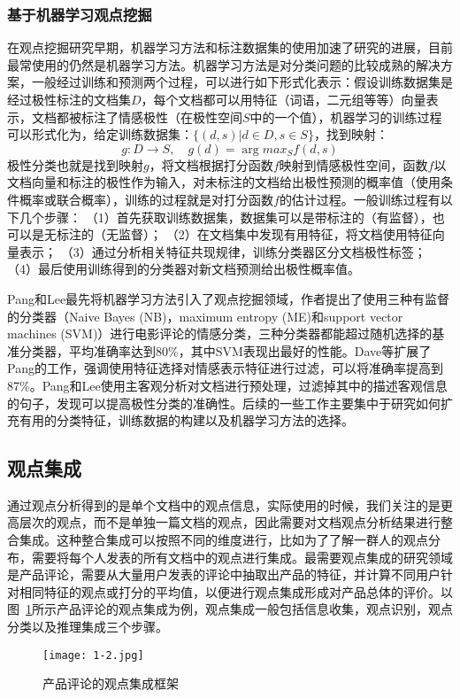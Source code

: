 \subsubsection{基于机器学习观点挖掘}
在观点挖掘研究早期，机器学习方法和标注数据集的使用加速了研究的进展，目前最常使用的仍然是机器学习方法。机器学习方法是对分类问题的比较成熟的解决方案，一般经过训练和预测两个过程，可以进行如下形式化表示：假设训练数据集是经过极性标注的文档集$D$，每个文档都可以用特征（词语，二元组等等）向量表示，文档都被标注了情感极性（在极性空间$S$中的一个值），机器学习的训练过程可以形式化为，给定训练数据集：$ \{(d,s)|d \in D,s \in S\} $，找到映射：
\begin{equation}
g:D \rightarrow S,\quad g(d)=\arg max_S f(d,s)
\end{equation}
极性分类也就是找到映射$ g $，将文档根据打分函数$ f $映射到情感极性空间，函数$ f $以文档向量和标注的极性作为输入，对未标注的文档给出极性预测的概率值（使用条件概率或联合概率），训练的过程就是对打分函数$ f $的估计过程。一般训练过程有以下几个步骤：
（1）首先获取训练数据集，数据集可以是带标注的（有监督），也可以是无标注的（无监督）；
（2）在文档集中发现有用特征，将文档使用特征向量表示；
（3）通过分析相关特征共现规律，训练分类器区分文档极性标签；
（4）最后使用训练得到的分类器对新文档预测给出极性概率值。

Pang和Lee最先将机器学习方法引入了观点挖掘领域，作者提出了使用三种有监督的分类器（Naive Bayes (NB)，maximum entropy (ME)和support vector machines (SVM)）进行电影评论的情感分类，三种分类器都能超过随机选择的基准分类器，平均准确率达到80\%，其中SVM表现出最好的性能。Dave等扩展了Pang的工作，强调使用特征选择对情感表示特征进行过滤，可以将准确率提高到87\%。Pang和Lee使用主客观分析对文档进行预处理，过滤掉其中的描述客观信息的句子，发现可以提高极性分类的准确性。后续的一些工作主要集中于研究如何扩充有用的分类特征，训练数据的构建以及机器学习方法的选择。

\subsection{观点集成}
\label{ch_integrate}
通过观点分析得到的是单个文档中的观点信息，实际使用的时候，我们关注的是更高层次的观点，而不是单独一篇文档的观点，因此需要对文档观点分析结果进行整合集成。这种整合集成可以按照不同的维度进行，比如为了了解一群人的观点分布，需要将每个人发表的所有文档中的观点进行集成。最需要观点集成的研究领域是产品评论，需要从大量用户发表的评论中抽取出产品的特征，并计算不同用户针对相同特征的观点或打分的平均值，以便进行观点集成形成对产品总体的评价。以图~\ref{fig1-2}所示产品评论的观点集成为例，观点集成一般包括信息收集，观点识别，观点分类以及推理集成三个步骤。
\begin{figure}[htp]
\centering
\texttt{[image: 1-2.jpg]}
\caption{产品评论的观点集成框架}
\label{fig1-2}
\end{figure}

